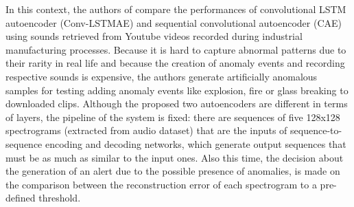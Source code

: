 In this context, the authors of \cite{13RealTimeDetectionUsingSequentialAutoencoder} compare the performances of convolutional LSTM autoencoder (Conv-LSTMAE)  and sequential convolutional autoencoder (CAE) using sounds retrieved from Youtube videos recorded during industrial manufacturing processes. Because it is hard to capture abnormal patterns due to their rarity in real life and because the creation of anomaly events and recording respective sounds is expensive, the authors generate artificially anomalous samples for testing adding anomaly events like explosion, fire or glass breaking to downloaded clips. Although the proposed two autoencoders are different in terms of layers, the pipeline of the system is fixed: there are sequences of five 128x128 spectrograms (extracted from audio dataset) that are the inputs of sequence-to-sequence encoding and decoding networks, which generate output sequences that must be as much as similar to the input ones. Also this time, the decision about the generation of an alert due to the possible presence of anomalies, is made on the comparison between the reconstruction error of each spectrogram to a pre-defined threshold.

